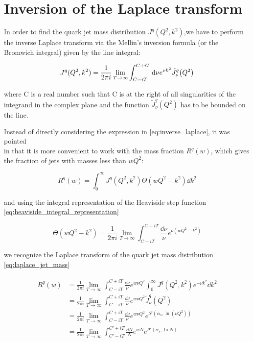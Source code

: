 \documentclass[../main.tex]{subfiles}
\begin{document}
\section{Inversion of the Laplace transform}

In order to find the quark jet mass distribution $J^q(Q^2,k^2)$,we have to perform the inverse Laplace transform via 
the Mellin's inversion formula (or the Bromwich integral) given by the line integral: 

\begin{equation} \label{eq:inverse_laplace}
    J^q(Q^2,k^2) = \frac{1}{2\pi i} \lim_{T \to \infty}\int_{C-iT}^{C+iT} \dd \nu e^{\nu k^2} \tilde{J}^q_\nu \qty(Q^2)
\end{equation}

where C is a real number such that C is at the right of all singularities of the integrand in the complex plane and
the function $\tilde{J}^q_\nu(Q^2)$ has to be bounded on the line.

Instead of directly considering the expression in \cref{eq:inverse_laplace}, it was pointed \\
in \cite{CATANI19933} that it is more convenient to work with the mass fraction $R^q(w)$, 
which gives the fraction of jets with masses less than $wQ^2$:

\begin{equation}\label{eq:jet mass fraction}
    R^q(w) = \int_0^\infty J^q(Q^2,k^2)\Theta(wQ^2-k^2) \dd k^2
\end{equation}

and using the integral representation of the Heaviside step function \cref{eq:heaviside_integral_representation}

\begin{equation}
    \Theta(wQ^2-k^2) = \frac{1}{2\pi i} \lim_{T \to \infty}\int_{C-iT}^{C+iT} \frac{\dd \nu}{\nu} e^{\nu (wQ^2-k^2)} 
\end{equation}

we recognize the Laplace transform of the quark jet mass distribution \cref{eq:laplace_jet_mass}

\begin{align}
    \begin{split}\label{eq:Rw mass fraction}
        R^q(w) &= \frac{1}{2\pi i} \lim_{T \to \infty} \int_{C-iT}^{C+iT} \frac{\dd \nu}{\nu} e^{w \nu Q^2} \int_0^\infty J^q(Q^2,k^2) e^{-\nu k^2} \dd k^2 \\
        &= \frac{1}{2\pi i} \lim_{T \to \infty} \int_{C-iT}^{C+iT} \frac{\dd \nu}{\nu} e^{w \nu Q^2} \tilde{J}^q_\nu(Q^2) \\
        &= \frac{1}{2\pi i} \lim_{T \to \infty} \int_{C-iT}^{C+iT} \frac{\dd \nu}{\nu} e^{w \nu Q^2} e^{\mathcal{F}(\alpha_s,\ln(\nu Q^2))}\\
        &= \frac{1}{2\pi i} \lim_{T \to \infty} \int_{C'-iT}^{C'+iT} \frac{\dd N}{N} e^{w N} e^{\mathcal{F}(\alpha_s,\ln N)}
    \end{split}
\end{align}
\end{document}
